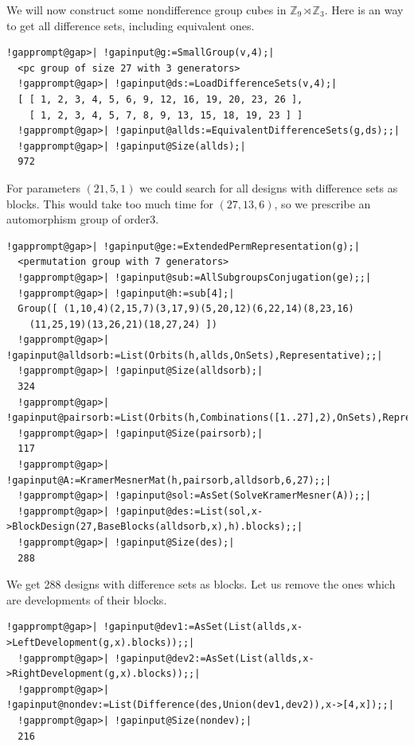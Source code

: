 \documentclass[a4paper,11pt]{report}
\begin{document}
{{ We will now construct some non\texttt{}difference group cubes in ${\ensuremath{\mathbb Z}}_9\rtimes {\ensuremath{\mathbb Z}}_3$. Here is an way to get all difference sets, including equivalent ones. 
\begin{Verbatim}[commandchars=!@|,fontsize=\small,frame=single,label=Example]
  !gapprompt@gap>| !gapinput@g:=SmallGroup(v,4);|
  <pc group of size 27 with 3 generators>
  !gapprompt@gap>| !gapinput@ds:=LoadDifferenceSets(v,4);|
  [ [ 1, 2, 3, 4, 5, 6, 9, 12, 16, 19, 20, 23, 26 ], 
    [ 1, 2, 3, 4, 5, 7, 8, 9, 13, 15, 18, 19, 23 ] ]
  !gapprompt@gap>| !gapinput@allds:=EquivalentDifferenceSets(g,ds);;|
  !gapprompt@gap>| !gapinput@Size(allds);|
  972
\end{Verbatim}
 For parameters $(21,5,1)$ we could search for all designs with difference sets as blocks. This would
take too much time for $(27,13,6)$, so we prescribe an automorphism group of order{\nobreakspace}3. 
\begin{Verbatim}[commandchars=!@|,fontsize=\small,frame=single,label=Example]
  !gapprompt@gap>| !gapinput@ge:=ExtendedPermRepresentation(g);|
  <permutation group with 7 generators>
  !gapprompt@gap>| !gapinput@sub:=AllSubgroupsConjugation(ge);;|
  !gapprompt@gap>| !gapinput@h:=sub[4];|
  Group([ (1,10,4)(2,15,7)(3,17,9)(5,20,12)(6,22,14)(8,23,16)
    (11,25,19)(13,26,21)(18,27,24) ])
  !gapprompt@gap>| !gapinput@alldsorb:=List(Orbits(h,allds,OnSets),Representative);;|
  !gapprompt@gap>| !gapinput@Size(alldsorb);|
  324
  !gapprompt@gap>| !gapinput@pairsorb:=List(Orbits(h,Combinations([1..27],2),OnSets),Representative);;|
  !gapprompt@gap>| !gapinput@Size(pairsorb);|
  117
  !gapprompt@gap>| !gapinput@A:=KramerMesnerMat(h,pairsorb,alldsorb,6,27);;|
  !gapprompt@gap>| !gapinput@sol:=AsSet(SolveKramerMesner(A));;|
  !gapprompt@gap>| !gapinput@des:=List(sol,x->BlockDesign(27,BaseBlocks(alldsorb,x),h).blocks);;|
  !gapprompt@gap>| !gapinput@Size(des);|
  288
\end{Verbatim}
 We get 288 designs with difference sets as blocks. Let us remove the ones
which are developments of their blocks. 
\begin{Verbatim}[commandchars=!@|,fontsize=\small,frame=single,label=Example]
  !gapprompt@gap>| !gapinput@dev1:=AsSet(List(allds,x->LeftDevelopment(g,x).blocks));;|
  !gapprompt@gap>| !gapinput@dev2:=AsSet(List(allds,x->RightDevelopment(g,x).blocks));;|
  !gapprompt@gap>| !gapinput@nondev:=List(Difference(des,Union(dev1,dev2)),x->[4,x]);;|
  !gapprompt@gap>| !gapinput@Size(nondev);|
  216
\end{Verbatim}
}}
\end{document}
